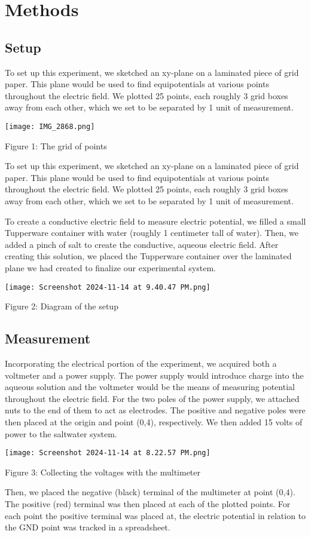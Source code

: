 \documentclass[conference]{IEEEtran}
\begin{document}
\section{Methods}
\subsection{Setup}
To set up this experiment, we sketched an xy-plane on a laminated piece of grid paper. This plane would be used to find equipotentials at various points throughout the electric field. We plotted 25 points, each roughly 3 grid boxes away from each other, which we set to be separated by 1 unit of measurement.
\begin{center}
    \texttt{[image: IMG\_2868.png]}
    
    Figure 1: The grid of points
\end{center}
To set up this experiment, we sketched an xy-plane on a laminated piece of grid paper. This plane would be used to find equipotentials at various points throughout the electric field. We plotted 25 points, each roughly 3 grid boxes away from each other, which we set to be separated by 1 unit of measurement.

To create a conductive electric field to measure electric potential, we filled a small Tupperware container with water (roughly 1 centimeter tall of water). Then, we added a pinch of salt to create the conductive, aqueous electric field. After creating this solution, we placed the Tupperware container over the laminated plane we had created to finalize our experimental system. 
\begin{center}
    \texttt{[image: Screenshot 2024-11-14 at 9.40.47 PM.png]}
    
    Figure 2: Diagram of the setup
\end{center}
\subsection{Measurement}
Incorporating the electrical portion of the experiment, we acquired both a voltmeter and a power supply. The power supply would introduce charge into the aqueous solution and the voltmeter would be the means of measuring potential throughout the electric field. For the two poles of the power supply, we attached nuts to the end of them to act as electrodes. The positive and negative poles were then placed at the origin and point (0,4), respectively. We then added 15 volts of power to the saltwater system.
\begin{center}
    \texttt{[image: Screenshot 2024-11-14 at 8.22.57 PM.png]}
    
    Figure 3: Collecting the voltages with the multimeter
\end{center}
Then, we placed the negative (black) terminal of the multimeter at point (0,4). The positive (red) terminal was then placed at each of the plotted points. For each point the positive terminal was placed at, the electric potential in relation to the GND point was tracked in a spreadsheet. 
\end{document}

